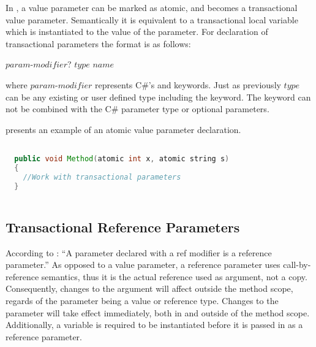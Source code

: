 In \stmnamesp, a value parameter can be marked as atomic, and becomes a transactional value parameter. Semantically it is equivalent to a transactional local variable which is instantiated to the value of the parameter.\cite[p. 76]{sestoft2011c} 
For declaration of transactional parameters the format is as follows:

 $param$-$modifier$? $type$ $name$

where $param$-$modifier$ represents C\#'s  and  keywords. Just as previously $type$ can be any existing or user defined type including the  keyword. The  keyword can not be combined with the C\#  parameter type or optional parameters\cite[p. 42]{sestoft2011c}.

 presents an example of an atomic value parameter declaration.

\begin{lstlisting}[label=lst:design_value_parameter,
  caption={Transactional Value Parameter},
  language=Java,  
  showspaces=false,
  showtabs=false,
  breaklines=true,
  showstringspaces=false,
  breakatwhitespace=true,
  commentstyle=\color{greencomments},
  keywordstyle=\color{bluekeywords},
  stringstyle=\color{redstrings},
  morekeywords={atomic, retry, orElse, var, get, set}]  % Start your code-block

  public void Method(atomic int x, atomic string s)
  {
  	//Work with transactional parameters
  }
    
\end{lstlisting}



\subsection{Transactional Reference Parameters}
According to \cite[p. 97]{csharp2013specificaiton}: ``A parameter declared with a ref modifier is a reference parameter.'' As opposed to a value parameter, a reference parameter uses call-by-reference semantics, thus it is the actual reference used as argument, not a copy. Consequently, changes to the argument will affect outside the method scope, regards of the parameter being a value or reference type. Changes to the parameter will take effect immediately, both in and outside of the method scope\cite[p. 42]{sestoft2011c}. Additionally, a variable is required to be instantiated before it is passed in as a reference parameter\cite[p. 97]{csharp2013specificaiton}.


